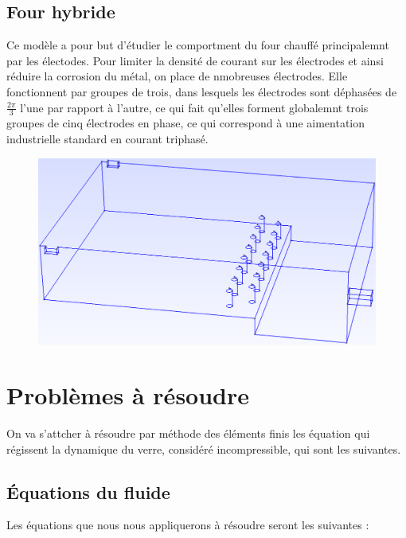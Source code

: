 \documentclass[12pt, a4paper, french, BCOR = 0pt, DIV = 10]{scrartcl}
\begin{document}
    \subsection{Four hybride}
    Ce modèle a pour but d'étudier le comportment du four chauffé principalemnt par les électodes. Pour limiter la densité de courant sur les électrodes et ainsi réduire la corrosion du métal, on place de nmobreuses électrodes. Elle fonctionnent par groupes de trois, dans lesquels les électrodes sont déphasées de $\frac{2\pi}{3}$ l'une par rapport à l'autre, ce qui fait qu'elles forment globalemnt trois groupes de cinq électrodes en phase, ce qui correspond à une aimentation industrielle standard en courant triphasé.

    \begin{center}
        \begin{figure}[H]
            \includegraphics[width=0.7\linewidth]{Four5Elec.png}
        \end{figure}
    \end{center}


    \section{Problèmes à résoudre}
    On va s'attcher à résoudre par méthode des éléments finis les équation qui régissent la dynamique du verre, considéré incompressible, qui sont les suivantes.
    
    \subsection{Équations du fluide}
    Les équations que nous nous appliquerons à résoudre seront les suivantes :
\end{document}
